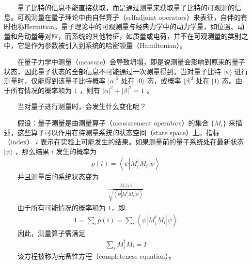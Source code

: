 \documentclass[a4paper,11pt,english]{sphinxmanual}
\begin{document}
\sphinxAtStartPar
  量子比特的信息不能直接获取，而是通过测量来获取量子比特的可观测的信息。可观测量在量子理论中由自伴算子（self\sphinxhyphen{}adjoint operators）来表征，自伴的有时也称Hermitian。量子理论中的可观测量与经典力学中的动力学量，如位置、动量和角动量等对应，而系统的其他特征，如质量或电荷，并不在可观测量的类别之中，它是作为参数被引入到系统的哈密顿量（Hamiltonian）。

\sphinxAtStartPar
  在量子力学中测量（measure）会导致坍塌，即是说测量会影响到原来的量子状态，因此量子状态的全部信息不可能通过一次测量得到。当对量子比特 \(|\psi\rangle\) 进行测量时，仅能得到该量子比特概率 \(|\alpha|^2\) 处在 \(|0 \rangle\) 态，或概率 \(|\beta|^2\) 处在 \(|1 \rangle\) 态。由于所有情况的概率和为 \(1\) ，则有 \(|\alpha|^{2}+|\beta|^{2}=1\) 。

\sphinxAtStartPar
  当对量子进行测量时，会发生什么变化呢？

\sphinxAtStartPar
  假设：量子测量是由测量算子（measurement operators）的集合 \(\{M_{i}\}\) 来描述，这些算子可以作用在待测量系统的状态空间（state space）上。指标（index） \(i\) 表示在实验上可能发生的结果。如果测量前的量子系统处在最新状态 \(|\psi\rangle\) ，那么结果  \(i\) 发生的概率为
\begin{equation*}
\begin{split}p(i)=\left\langle\psi\left|M_{i}^{\dagger} M_{i}\right| \psi\right\rangle\end{split}
\end{equation*}
\sphinxAtStartPar
  并且测量后的系统状态变为
\begin{equation*}
\begin{split}\frac{M_{i}|\psi\rangle}{\sqrt{\left\langle\psi\left|M_{i}^{\dagger} M_{i}\right| \psi\right\rangle}}\end{split}
\end{equation*}
\sphinxAtStartPar
  由于所有可能情况的概率和为 \(1\) ​，即
\begin{equation*}
\begin{split}1=\sum_{i} p(i)=\sum_{i}\left\langle\psi\left|M_{i}^{\dagger} M_{i}\right| \psi\right\rangle\end{split}
\end{equation*}
\sphinxAtStartPar
  因此，测量算子需满足
\begin{equation*}
\begin{split}\sum_{i} M_{i}^{\dagger} M_{i}=I\end{split}
\end{equation*}
\sphinxAtStartPar
  该方程被称为完备性方程（completeness equation）。
\end{document}
